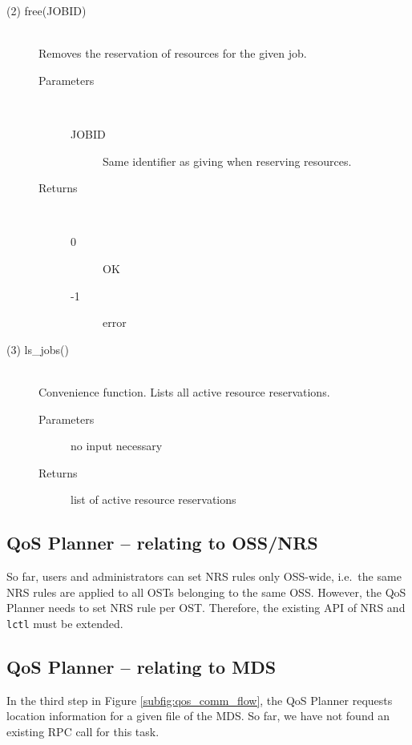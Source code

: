 \documentclass[10pt]{article}
\begin{document}
\begin{description}
\item[(2) free(JOBID)]~\\ Removes the reservation of resources for the given job.
  \begin{description}
    \item[Parameters]~\\
        \begin{description}
            \item[JOBID] Same identifier as giving when reserving resources. %
        \end{description}
    \item[Returns]~\\
        \begin{description}
            \item[0] OK
            \item[-1] error
        \end{description}
  \end{description}


\item[(3) ls\_jobs()]~\\ Convenience function. Lists all active resource reservations.
  \begin{description}
    \item[Parameters] no input necessary
    \item[Returns] list of active resource reservations
  \end{description}
\end{description}


\subsection{QoS Planner -- relating to OSS/NRS}
So far, users and administrators can set NRS rules only OSS-wide, i.e.\ the same NRS rules are applied to all OSTs belonging to the same OSS.
However, the QoS Planner needs to set NRS rule per OST.
Therefore, the existing API of NRS and \texttt{lctl} must be extended.

\subsection{QoS Planner -- relating to MDS}
In the third step in Figure \ref{subfig:qos_comm_flow}, the QoS Planner requests location information for a given file of the MDS.
So far, we have not found an existing RPC call for this task.
\end{document}
